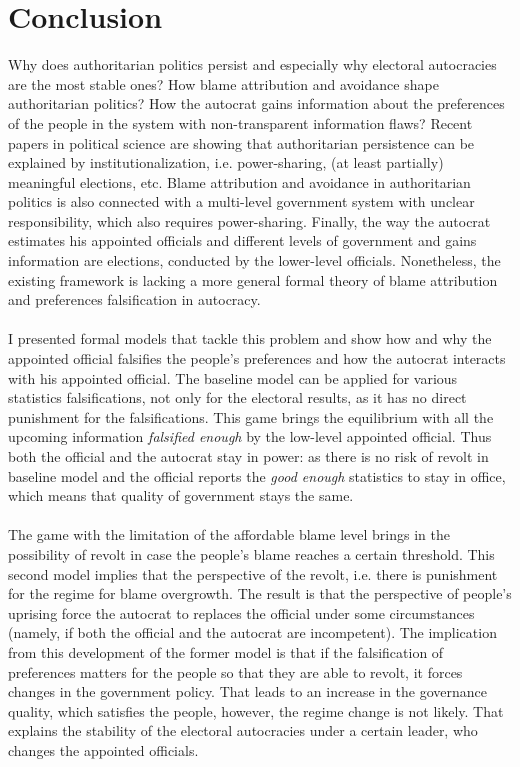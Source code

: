 \documentclass[a4paper, 12pt]{article}
\begin{document}
	\section{Conclusion}
	Why does authoritarian politics persist and especially why electoral autocracies are the most stable ones? How blame attribution and avoidance shape authoritarian politics? How the autocrat gains information about the preferences of the people in the system with non-transparent information flaws? Recent papers in political science are showing that authoritarian persistence can be explained by institutionalization, i.e. power-sharing, (at least partially) meaningful elections, etc. Blame attribution and avoidance in authoritarian politics is also connected with a multi-level government system with unclear responsibility, which also requires power-sharing. Finally, the way the autocrat estimates his appointed officials and different levels of government and gains information are elections, conducted by the lower-level officials. Nonetheless, the existing framework is lacking a more general formal theory of blame attribution and preferences falsification in autocracy.\\\\
	I presented formal models that tackle this problem and show how and why the appointed official falsifies the people's preferences and how the autocrat interacts with his appointed official. The baseline model can be applied for various statistics falsifications, not only for the electoral results, as it has no direct punishment for the falsifications. This game brings the equilibrium with all the upcoming information \textit{falsified enough} by the low-level appointed official. Thus both the official and the autocrat stay in power: as there is no  risk of revolt in baseline model and the official reports the \textit{good enough} statistics to stay in office, which means that quality of government stays the same.\\\\
	The game with the limitation of the affordable blame level brings in the possibility of revolt in case the people's blame reaches a certain threshold. This second model implies that the perspective of the revolt, i.e. there is punishment for the regime for blame overgrowth. The result is that the perspective of people's uprising force the autocrat to replaces the official under some circumstances (namely, if both the official and the autocrat are incompetent). The implication from this development of the former model is that if the falsification of preferences matters for the people so that they are able to revolt, it forces changes in the government policy. That leads to an increase in the governance quality, which satisfies the people, however, the regime change is not likely. That explains the stability of the electoral autocracies under a certain leader, who changes the appointed officials.\\\\
\end{document}
